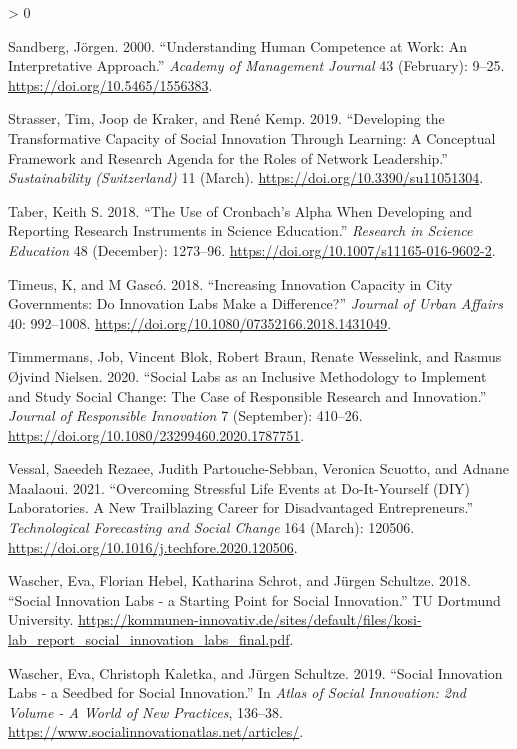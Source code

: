 \documentclass[AMA,STIX1COL,APA,STIX2COL]{WileyNJD-v2}
\newlength{\cslhangindent}
\newenvironment{CSLReferences}[2] %
 {%
  \setlength{\parindent}{0pt}
  \ifodd #1 \everypar{\setlength{\hangindent}{\cslhangindent}}\ignorespaces\fi
  \ifnum #2 > 0
  \setlength{\parskip}{#2\baselineskip}
  \fi
 }%
 {}
\begin{document}
\begin{CSLReferences}{1}{0}
\leavevmode\hypertarget{ref-Sandberg2000}{}%
Sandberg, Jörgen. 2000. {``Understanding Human Competence at Work: An
Interpretative Approach.''} \emph{Academy of Management Journal} 43
(February): 9--25. \url{https://doi.org/10.5465/1556383}.

\leavevmode\hypertarget{ref-Strasser2019}{}%
Strasser, Tim, Joop de Kraker, and René Kemp. 2019. {``Developing the
Transformative Capacity of Social Innovation Through Learning: A
Conceptual Framework and Research Agenda for the Roles of Network
Leadership.''} \emph{Sustainability (Switzerland)} 11 (March).
\url{https://doi.org/10.3390/su11051304}.

\leavevmode\hypertarget{ref-Taber2018}{}%
Taber, Keith S. 2018. {``The Use of Cronbach's Alpha When Developing and
Reporting Research Instruments in Science Education.''} \emph{Research
in Science Education} 48 (December): 1273--96.
\url{https://doi.org/10.1007/s11165-016-9602-2}.

\leavevmode\hypertarget{ref-Timeus2018}{}%
Timeus, K, and M Gascó. 2018. {``Increasing Innovation Capacity in City
Governments: Do Innovation Labs Make a Difference?''} \emph{Journal of
Urban Affairs} 40: 992--1008.
\url{https://doi.org/10.1080/07352166.2018.1431049}.

\leavevmode\hypertarget{ref-Timmermans2020}{}%
Timmermans, Job, Vincent Blok, Robert Braun, Renate Wesselink, and
Rasmus Øjvind Nielsen. 2020. {``Social Labs as an Inclusive Methodology
to Implement and Study Social Change: The Case of Responsible Research
and Innovation.''} \emph{Journal of Responsible Innovation} 7
(September): 410--26.
\url{https://doi.org/10.1080/23299460.2020.1787751}.

\leavevmode\hypertarget{ref-RezaeeVessal2021}{}%
Vessal, Saeedeh Rezaee, Judith Partouche-Sebban, Veronica Scuotto, and
Adnane Maalaoui. 2021. {``Overcoming Stressful Life Events at
Do-It-Yourself (DIY) Laboratories. A New Trailblazing Career for
Disadvantaged Entrepreneurs.''} \emph{Technological Forecasting and
Social Change} 164 (March): 120506.
\url{https://doi.org/10.1016/j.techfore.2020.120506}.

\leavevmode\hypertarget{ref-Wascher2018}{}%
Wascher, Eva, Florian Hebel, Katharina Schrot, and Jürgen Schultze.
2018. {``Social Innovation Labs - a Starting Point for Social
Innovation.''} TU Dortmund University.
\url{https://kommunen-innovativ.de/sites/default/files/kosi-lab_report_social_innovation_labs_final.pdf}.

\leavevmode\hypertarget{ref-Wascher2019}{}%
Wascher, Eva, Christoph Kaletka, and Jürgen Schultze. 2019. {``Social
Innovation Labs - a Seedbed for Social Innovation.''} In \emph{Atlas of
Social Innovation: 2nd Volume - A World of New Practices}, 136--38.
\url{https://www.socialinnovationatlas.net/articles/}.


\end{CSLReferences}
\end{document}
